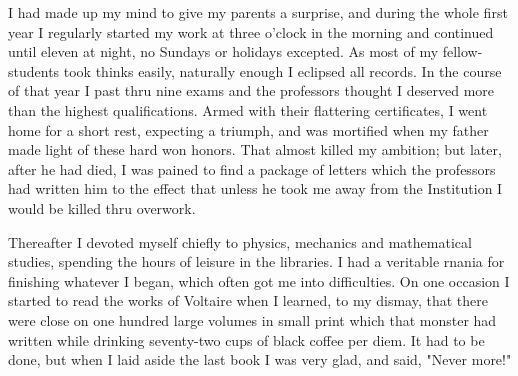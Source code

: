 \documentclass[a4paper,12pt,english,twoside,openright]{memoir}
\begin{document}
I had made up my mind to give my parents a surprise, and during the whole first year I regularly 
started my work at three o'clock in the morning and continued until eleven at night, no Sundays or 
holidays excepted.  As most of my fellow-students took thinks easily, naturally enough I eclipsed 
all records.  In the course of that year I past thru nine exams and the professors thought I 
deserved more than the highest qualifications.  Armed with their flattering certificates, I went 
home for a short rest, expecting a triumph, and was mortified when my father made light of these 
hard won honors.  That almost killed my ambition; but later, after he had died, I was pained to find 
a package of letters which the professors had written him to the effect that unless he took me 
away from the Institution I would be killed thru overwork.  

Thereafter I devoted myself chiefly to physics, mechanics and mathematical studies, spending 
the hours of leisure in the libraries.  I had a veritable rnania for finishing whatever I began, which 
often got me into difficulties.  On one occasion I started to read the works of Voltaire when I 
learned, to my dismay, that there were close on one hundred large volumes in small print which 
that monster had written while drinking seventy-two cups of black coffee per diem.  It had to be 
done, but when I laid aside the last book I was very glad, and said, "Never more!" 
\end{document}
